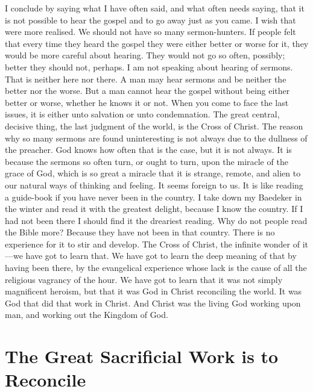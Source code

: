 \documentclass[draft]{ptfdoc}
\begin{document}
I conclude by saying what I have often said, 
and what often needs saying, that it is not 
possible to hear the gospel and to go away just 
as you came. I wish that were more realised. 
We should not have so many sermon-hunters. 
If people felt that every time they heard the 
gospel they were either better or worse for it, 
they would be more careful about hearing. 
They would not go so often, possibly; better they 
should not, perhaps. I am not speaking about 
hearing of sermons. That is neither here nor 
there. A man may hear sermons and be neither 
the better nor the worse. But a man cannot 
hear the gospel without being either better or 
worse, whether he knows it or not. When you 
come to face the last issues, it is either unto 
salvation or unto condemnation. The great 
central, decisive thing, the last judgment of the 
world, is the Cross of Christ. The reason why 
so many sermons are found uninteresting is not 
always due to the dullness of the preacher. God 
knows how often that is the case, but it is not 
always. It is because the sermons so often turn, 
or ought to turn, upon the miracle of the grace 
of God, which is so great a miracle that it is 
strange, remote, and alien to our natural ways 
of thinking and feeling. It seems foreign to us. 
It is like reading a guide-book if you have never 
been in the country. I take down my Baedeker 
in the winter and read it with the greatest 
delight, because I know the country. If I had 
not been there I should find it the dreariest reading. 
Why do not people read the Bible more? 
Because they have not been in that country. 
There is no experience for it to stir and develop. 
The Cross of Christ, the infinite wonder of it---we 
have got to learn that. We have got to 
learn the deep meaning of that by having been 
there, by the evangelical experience whose lack 
is the cause of all the religious vagrancy of the 
hour. We have got to learn that it was not 
simply magnificent heroism, but that it was God 
in Christ reconciling the world. It was God 
that did that work in Christ. And Christ was 
the living God working upon man, and working 
out the Kingdom of God. 

\chapter{The Great Sacrificial Work is to Reconcile} 

\end{document}

